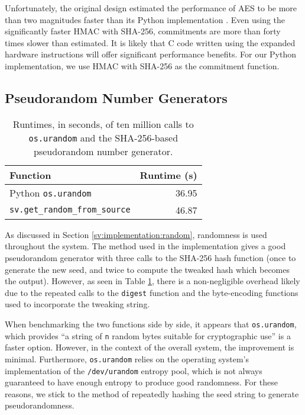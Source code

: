 Unfortunately, the original design estimated the performance of AES to be more than two magnitudes faster than its Python implementation \cite{rrv}. Even using the significantly faster HMAC with SHA-256, commitments are more than forty times slower than estimated. It is likely that C code written using the expanded hardware instructions will offer significant performance benefits. For our Python implementation, we use HMAC with SHA-256 as the commitment function.

\subsection{Pseudorandom Number Generators} \label{perf:crypto:random}

\begin{table}[htbp]
\centering
\begin{tabular}{l | r}
  \textbf{Function} & \textbf{Runtime (s)} \\
  \hline
  Python \texttt{os.urandom} & 36.95 \\
  \texttt{sv.get\_random\_from\_source} & 46.87
\end{tabular}
\caption[Performance measurements of pseudorandom number generators]{Runtimes, in seconds, of ten million calls to \texttt{os.urandom} and the SHA-256-based pseudorandom number generator.}
\label{table:perf:rand}
\end{table}

As discussed in Section \ref{sv:implementation:random}, randomness is used throughout the system. The method used in the implementation gives a good pseudorandom generator with three calls to the SHA-256 hash function (once to generate the new seed, and twice to compute the tweaked hash which becomes the output). However, as seen in Table \ref{table:perf:rand}, there is a non-negligible overhead likely due to the repeated calls to the \texttt{digest} function and the byte-encoding functions used to incorporate the tweaking string.

When benchmarking the two functions side by side, it appears that \texttt{os.urandom}, which provides ``a string of \texttt{n} random bytes suitable for cryptographic use'' \cite{python-urandom} is a faster option. However, in the context of the overall system, the improvement is minimal. Furthermore, \texttt{os.urandom} relies on the operating system's implementation of the \texttt{/dev/urandom} entropy pool, which is not always guaranteed to have enough entropy to produce good randomness. For these reasons, we stick to the method of repeatedly hashing the seed string to generate pseudorandomness.

